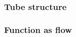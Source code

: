 \documentclass[aspectratio=169]{beamer}
\begin{document}
\begin{frame}
\frametitle{Tube structure}
\begin{figure}[ht]\centering
{}
\end{figure}

\end{frame}

\begin{frame}
\frametitle{Function as flow}
\begin{figure}[ht]\centering
{}
\end{figure}
\end{frame}
\end{document}
